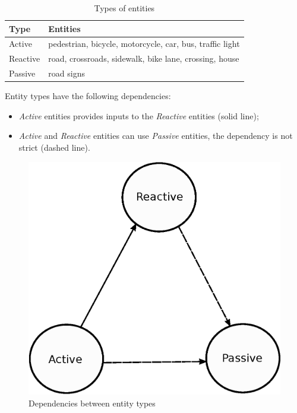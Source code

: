 
\begin{table}[H]
\centering
\begin{tabular}{|l|l|}
\hline
\rowcolor{BlueGreen}
Type     & Entities                                 \\ \hline
Active   & pedestrian, bicycle, motorcycle, car, bus, traffic light \\ \hline
Reactive & road, crossroads, sidewalk, bike lane, crossing, house \\ \hline
Passive  & road signs                               \\ \hline
\end{tabular}
\caption{Types of entities}
\label{tab:entity_type}
\end{table}
Entity types have the following dependencies:
\begin{itemize}
  \item \textit{Active} entities provides inputs to the \textit{Reactive}
entities (solid line);
  \item \textit{Active} and \textit{Reactive} entities can use \textit{Passive}
entities, the dependency is not strict (dashed line).
\end{itemize}
\begin{figure}[H]
  \centering
  \includegraphics[width=.35\columnwidth]{images/solution/entity_type_dependency.eps}
  \caption{Dependencies between entity types}
  \label{fig:sd-entity-types-deps}
\end{figure}
